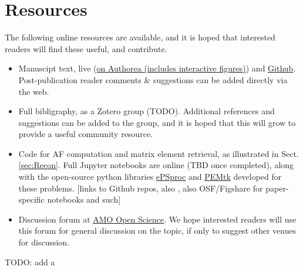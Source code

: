 \section{Resources\label{sec:resources}}

The following online resources are available, and it is hoped that interested readers will find these useful, and contribute.

\begin{itemize}
\item Manuscipt text, live (\href{https://www.authorea.com/users/71114/articles/447808-extracting-molecular-frame-photoionization-dynamics-from-experimental-data}{on Authorea (includes interactive figures)}) and \href{https://github.com/phockett/Extracting-Molecular-Frame-Photoionization-Dynamics-from-Experimental-Data}{Github}. Post-publication reader comments \& suggestions can be added directly via the web.
\item Full bibligraphy, as a Zotero group (TODO). Additional references and suggestions can be added to the group, and it is hoped that this will grow to provide a useful community resource.
\item Code for AF computation and matrix element retrieval, as illustrated in Sect. \ref{sec:Recon}. Full Jupyter notebooks are online (TBD once completed), along with the open-source python libraries \href{https://epsproc.readthedocs.io}{ePSproc} and \href{https://pemtk.readthedocs.io}{PEMtk} developed for these problems. [links to Github repos, also \cite{ePSprocAuthorea,ePSprocFigshare,ePSprocGithub}, also OSF/Figshare for paper-specific notebooks and such]
\item Discussion forum at \href{https://amoopenscience.femtolab.ca/}{AMO Open Science}. We hope interested readers will use this forum for general discussion on the topic, if only to suggest other venues for discussion.
\end{itemize}

TODO: add a